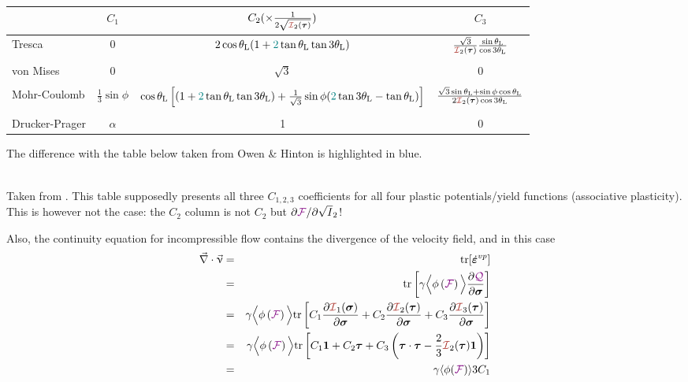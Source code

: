\begin{center}
\begin{footnotesize}
\begin{tabular}{lccc}
\hline
& $C_1$ & $C_2(\times \frac{1}{2 \sqrt{{\III}_2({\bm \tau})}})$ & $C_3$ \\
              \hline\hline
Tresca         &0 & $2 \cos\theta_{\rm L} ( 1 + {\color{teal}2} \tan\theta_{\rm L}  \tan 3\theta_{\rm L})$ &
$\frac{\sqrt{3}}{{\III}_2({\bm \tau}) } \frac{\sin\theta_{\rm L} }{\cos 3\theta_{\rm L}}$
\\ \\
von Mises      &0& $\sqrt{3}$ & 0 \\ \\ 
Mohr-Coulomb   & $\frac13 \sin\phi$ & 
$
\cos \theta_{\rm L} \left[
(1 +  {\color{teal}2}\tan \theta_{\rm L}   \tan 3\theta_{\rm L})
+\frac{1}{\sqrt{3}} \sin\phi
( {\color{teal}2}\tan 3\theta_{\rm L} - \tan\theta_{\rm L}) \right]$
&
$\frac{\sqrt{3}\sin\theta_{\rm L} +  \sin \phi \cos \theta_{\rm L}}
{2 {\III}_2({\bm \tau}) \cos 3\theta_{\rm L}}$ 
\\ \\
Drucker-Prager & $\alpha$ & 1 & 0 \\  
\hline
\end{tabular}
\end{footnotesize}
\end{center}
The difference with the table below  taken from Owen \& Hinton \cite{owhi} is highlighted in blue.

\begin{center}
\\
{\captionfont Taken from \cite{owhi}.
This table supposedly presents all three $C_{1,2,3}$ coefficients 
for all four plastic potentials/yield functions (associative plasticity).
This is however not the case: the $C_2$ column is not $C_2$ but 
$\partial {\color{violet}\cal F}/\partial\sqrt I_2$!
}
\end{center}


Also, the continuity equation for incompressible flow contains the divergence 
of the velocity field, and in this case 
\begin{eqnarray}
\vec\nabla\cdot\vec\upnu 
&=& {\rm tr}[\dot{\bm\varepsilon}^{vp}]  \nn\\
&=& {\rm tr}\left[ 
\gamma \Big\langle
\phi\left( {\FFF} \right) 
\Big\rangle
\frac{\partial \QQQ}{\partial \bm\sigma}
\right] \nn\\
&=& 
\gamma \Big\langle
\phi\left( {\FFF} \right) 
\Big\rangle
{\rm tr}\left[
C_1  \frac{\partial {\III}_1(\bm\sigma)}{\partial \bm\sigma} 
+
C_2  \frac{\partial {\III}_2(\bm\tau)}{\partial \bm\sigma} 
+
C_3  \frac{\partial {\III}_3(\bm\tau)}{\partial \bm\sigma} 
\right] \nn\\
&=&
\gamma \Big\langle
\phi\left( {\FFF} \right) 
\Big\rangle
{\rm tr}\left[
C_1 {\bm 1} 
+
C_2 {\bm \tau} 
+
C_3  \left( \bm\tau\cdot\bm\tau - \frac23  {\III}_2(\bm\tau)  {\bm 1} \right)
\right] \nn\\
&=&  \gamma \langle \phi(\FFF) \rangle  3 C_1
\end{eqnarray}

